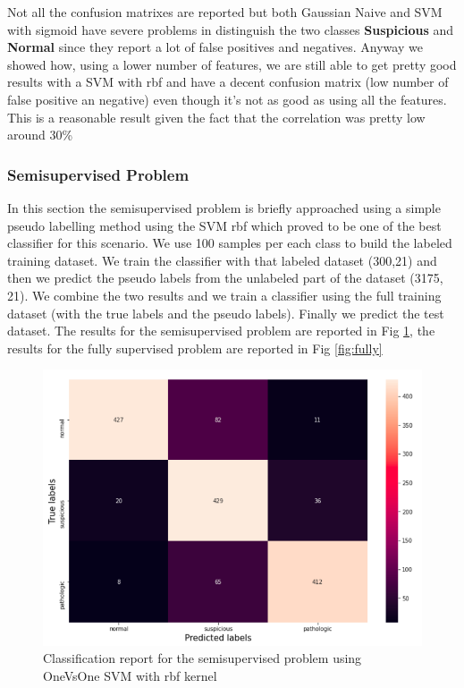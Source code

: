 \documentclass[a4paper,12pt]{article}
\begin{document}
\noindent Not all the confusion matrixes are reported but both Gaussian Naive and SVM with sigmoid have severe problems in distinguish the two classes \textbf{Suspicious} and \textbf{Normal} since they report a lot of false positives and negatives. Anyway we showed how, using a lower number of features, we are still able to get pretty good results with a SVM with rbf and have a decent confusion matrix (low number of false positive an negative) even though it's not as good as using all the features. This is a reasonable result given the fact that the correlation was pretty low around 30\%

\subsubsection{Semisupervised Problem}
In this section the semisupervised problem is briefly approached using a simple pseudo labelling method using the SVM rbf which proved to be one of the best classifier for this scenario. We use 100 samples per each class to build the labeled training dataset. We train the classifier with that labeled dataset (300,21) and then we predict the pseudo labels from the unlabeled part of the dataset (3175, 21). We combine the two results and we train a classifier using the full training dataset (with the true labels and the pseudo labels). Finally we predict the test dataset. The results for the semisupervised problem are reported in Fig \ref{fig:semi}, the results for the fully supervised problem are reported in Fig \ref{fig:fully}  

\begin{figure}[H]
  \begin{center}
  \includegraphics[width=1.0\textwidth]{images/semi.png}
  \end{center}
  \caption{Classification report for the semisupervised problem using OneVsOne SVM with rbf kernel}
  \label{fig:semi}
\end{figure}
\end{document}
